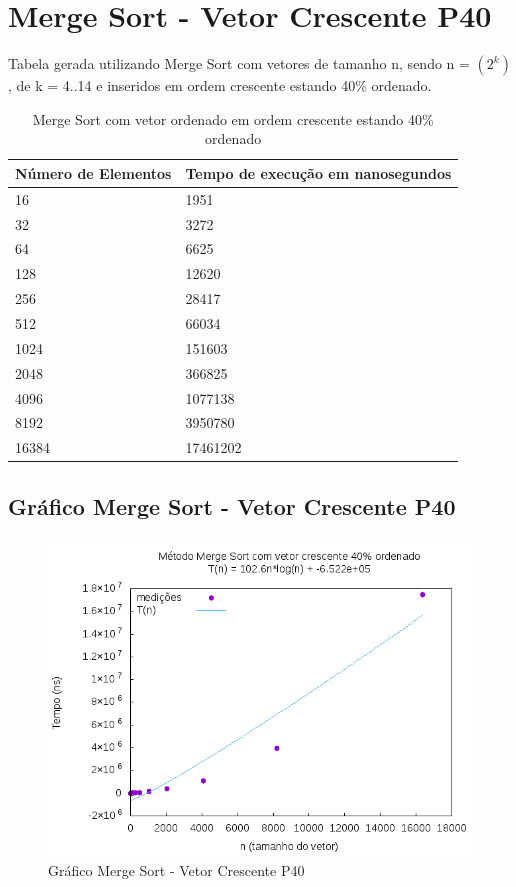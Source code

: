 \documentclass[12pt,a4paper,twoside]{report}
\begin{document}
\section{Merge Sort - Vetor Crescente P40}
Tabela gerada utilizando Merge Sort com vetores de tamanho n, sendo n = $(2^k)$, de k = 4..14 e inseridos em ordem crescente estando 40\% ordenado.
\begin{table}[H]
\centering
\caption{Merge Sort com vetor ordenado em ordem crescente estando 40\% ordenado}
\label{my-label}
\begin{tabular}{|l|l|}
\hline
\multicolumn{1}{|c|}{\textbf{Número de Elementos}} & \multicolumn{1}{c|}{\textbf{Tempo de execução em nanosegundos}} \\ \hline
16 & 1951 \\ \hline
32 & 3272 \\ \hline
64 & 6625 \\ \hline
128 & 12620 \\ \hline
256 & 28417 \\ \hline
512 & 66034 \\ \hline
1024 & 151603 \\ \hline
2048 & 366825 \\ \hline
4096 & 1077138 \\ \hline
8192 & 3950780 \\ \hline
16384 & 17461202 \\ \hline
\end{tabular}
\end{table}

\subsection{Gráfico Merge Sort - Vetor Crescente P40}
\begin{figure}[H]
    \centering
    \includegraphics[width=0.7\linewidth]{graficos/MergeSort/vIntCrescenteP40/vIntCrescenteP40.png}
  \caption{Gráfico Merge Sort - Vetor Crescente P40}
\end{figure}
\end{document}
